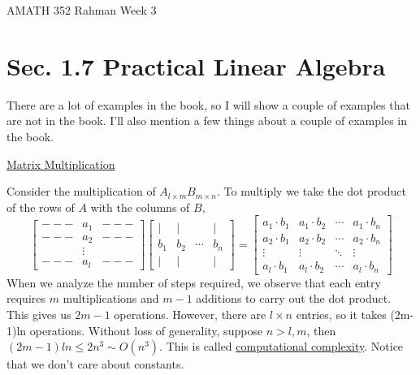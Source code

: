 \documentclass[reqno]{amsart}
\theoremstyle{definition}
\begin{document}
\begin{flushleft}
{\sc \Large AMATH 352 Rahman} \hfill Week 3
\bigskip
\end{flushleft}

\newcommand{\R}{\mathbb{R}}
\newcommand{\N}{\mathbb{N}}
\newcommand{\Z}{\mathbb{Z}}
\newcommand{\Q}{\mathbb{Q}}
\renewcommand{\CancelColor}{\color{red}}
\newcommand{\?}{\stackrel{?}{=}}
\renewcommand{\varphi}{\phi}
\newcommand{\card}{\text{Card}}
\newcommand{\bigzero}{\text{\Huge 0}}
\newcommand{\curvearrowdown}{{\color{red}\rotatebox{90}{$\curvearrowleft$}}}
\newcommand{\curvearrowup}{{\color{red}\rotatebox{90}{$\curvearrowright$}}}



\section*{Sec. 1.7 Practical Linear Algebra}

There are a lot of examples in the book, so I will show a couple of examples that are not in the book.  I'll also mention a few things about a couple of examples in the book.

\underline{Matrix Multiplication}

Consider the multiplication of $A_{l\times m}B_{m\times n}$.  To multiply we take the dot product of the rows of $A$ with the columns of $B$,
%
\begin{equation*}
\begin{bmatrix}
--- & a_1 & ---\\
--- & a_2 & ---\\
 & \vdots & \\
 --- & a_l & ---
\end{bmatrix}\begin{bmatrix}
| & | &  & |\\
b_1 & b_2 & \cdots & b_n\\
| & | & & |
\end{bmatrix} = \begin{bmatrix}
a_1\cdot b_1 & a_1\cdot b_2 & \cdots & a_1\cdot b_n\\
a_2\cdot b_1 & a_2\cdot b_2 & \cdots & a_2\cdot b_n\\
\vdots & \vdots & \ddots & \vdots\\
a_l\cdot b_1 & a_l\cdot b_2 & \cdots & a_l\cdot b_n
\end{bmatrix}
\end{equation*}
%
When we analyze the number of steps required, we observe that each entry requires $m$ multiplications and $m-1$ additions to carry out the dot product.  This gives us $2m-1$ operations.  However, there are $l\times n$ entries, so it takes (2m-1)ln operations.  Without loss of generality, suppose $n > l,m$, then $(2m-1)ln \leq 2n^3 \sim O(n^3)$.  {\color{red}This is called \underline{computational complexity}.}  {\color{blue}Notice that we don't care about constants.}
\end{document}
